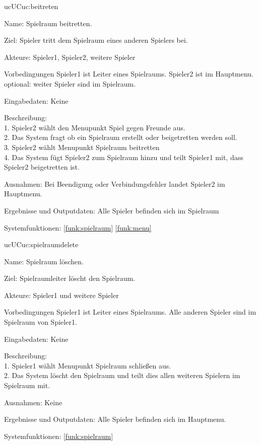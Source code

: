 \begin{description}[leftmargin=5em, style=sameline]
	\begin{lhp}{uc}{UC}{uc:beitreten}
		\item [Name:] Spielraum beitretten.
		\item [Ziel:] Spieler tritt dem Spielraum eines anderen Spielers bei.
		\item [Akteure:] Spieler1, Spieler2, weitere Spieler
		\item [Vorbedingungen] Spieler1 ist Leiter eines Spielraums. Spieler2 ist im Hauptmenu. optional: weiter Spieler sind im Spielraum.
		\item [Eingabedaten:] Keine
		\item [Beschreibung:] \hfill\\
				1. Spieler2 wählt den Menupunkt Spiel gegen Freunde aus.\\
				2. Das System fragt ob ein Spielraum erstellt oder beigetretten werden soll. \\
				3. Spieler2 wählt Menupunkt Spielraum beitretten \\
				4. Das System fügt Spieler2 zum Spielraum hinzu und teilt Spieler1 mit, dass Spieler2 beigetretten ist.
		\item [Ausnahmen:] Bei Beendigung oder Verbindungsfehler landet Spieler2 im Hauptmenu.
		\item [Ergebnisse und Outputdaten:] Alle Spieler befinden sich im Spielraum
		\item [Systemfunktionen:] \ref{funk:spielraum} \ref{funk:menu}
	\end{lhp}

	\begin{lhp}{uc}{UC}{uc:spielraumdelete}
		\item [Name:] Spielraum löschen.
		\item [Ziel:] Spielraumleiter löscht den Spielraum.
		\item [Akteure:] Spieler1 und weitere Spieler
		\item [Vorbedingungen] Spieler1 ist Leiter eines Spielraums. Alle anderen Spieler sind im Spielraum von Spieler1.
		\item [Eingabedaten:] Keine
		\item [Beschreibung:] \hfill\\
				1. Spieler1 wählt Menupunkt Spielraum schließen aus.\\
				2. Das System löscht den Spielraum und teilt dies allen weiteren Spielern im Spielraum mit.
		\item [Ausnahmen:] Keine
		\item [Ergebnisse und Outputdaten:] Alle Spieler befinden sich im Hauptmenu.
		\item [Systemfunktionen:] \ref{funk:spielraum}
	\end{lhp}


\end{description}
